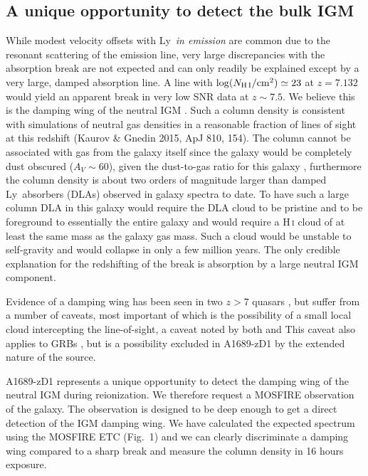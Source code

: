 \documentclass[letter,12pt]{article}
\newcommand{\lya}{Ly\textalpha}
\begin{document}
\subsection{A unique opportunity to detect the bulk IGM}

While modest velocity offsets with \lya\ \emph{in emission} are common due to
the resonant scattering of the emission line, very large discrepancies with the
absorption break are not expected and can only readily be explained except by a
very large, damped absorption line. A line with \(\log(N_{{\rm H\,I}}/{\rm
cm}^2)\simeq23\) at \(z=7.132\) would yield an apparent break in very low SNR
data at \(z\sim7.5\). We believe this is the damping wing of the neutral IGM
\citep[the Gunn-Peterson damping wing;][]{1998ApJ...501...15M}. Such a column
density is consistent with simulations of neutral gas densities in a reasonable
fraction of lines of sight at this redshift (Kaurov \& Gnedin 2015, ApJ 810,
154). The column cannot be associated with gas from the galaxy itself since the
galaxy would be completely dust obscured (\(A_V \sim 60\)), given the
dust-to-gas ratio for this galaxy \citep{watson15}, furthermore the column
density is about two orders of magnitude larger than damped \lya\ absorbers
(DLAs) observed in galaxy spectra to date. To have such a large column DLA in
this galaxy would require the DLA cloud to be pristine and to be foreground to
essentially the entire galaxy and would require a H\,\textsc{i} cloud of at
least the same mass as the galaxy gas mass. Such a cloud would be unstable to
self-gravity and would collapse in only a few million years. The only credible
explanation for the redshifting of the break is absorption by a large neutral
IGM component.

Evidence of a damping wing has been seen in two \(z>7\) quasars
\citep{2011Natur.474..616M,2018Natur.553..473B}, but suffer from a number of
caveats, most important of which is the possibility of a small local cloud
intercepting the line-of-sight, a caveat noted by both
\citeauthor{2011Natur.474..616M} and \citeauthor{2018Natur.553..473B} This
caveat also applies to GRBs \citep[e.g.][]{2009Natur.461.1254T}, but is a
possibility excluded in A1689-zD1 by the extended nature of the source.

A1689-zD1 represents a unique opportunity to detect the damping wing of the
neutral IGM during reionization. We therefore request a MOSFIRE observation of
the galaxy. The observation is designed to be deep enough to get a direct
detection of the IGM damping wing.  We have calculated the expected spectrum
using the MOSFIRE ETC (Fig.~1) and we can clearly discriminate a damping wing
compared to a sharp break and measure the column density in 16 hours exposure.
\end{document}
